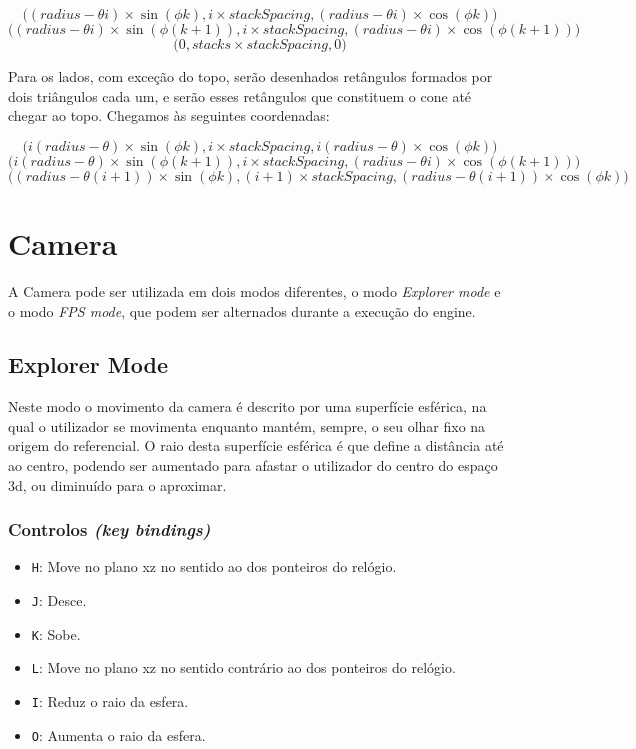 \documentclass[a4paper]{article}
\newcommand{\x}{\times}
\begin{document}
\[\Big((radius - \theta i) \x \sin(\phi k), i \x stackSpacing, (radius - \theta i) \x \cos(\phi k)\Big)\]
\[\Big((radius - \theta i) \x \sin(\phi (k + 1)), i \x stackSpacing, (radius - \theta i) \x \cos(\phi (k + 1))\Big)\]
\[\Big(0, stacks \x stackSpacing, 0\Big)\]

Para os lados, com exceção do topo, serão desenhados retângulos formados por dois triângulos cada um, e serão esses retângulos que constituem o cone até chegar ao topo. Chegamos às seguintes coordenadas:

\[\Big(i(radius - \theta) \x \sin(\phi k), i \x stackSpacing, i(radius - \theta) \x \cos(\phi k)\Big)\]
\[\Big(i(radius - \theta) \x \sin(\phi (k + 1)), i \x stackSpacing, (radius - \theta i) \x \cos(\phi (k + 1))\Big)\]
\[\Big((radius - \theta (i + 1)) \x \sin(\phi k), (i + 1) \x stackSpacing, (radius - \theta (i + 1)) \x \cos(\phi k)\Big)\]

\section{Camera}
A Camera pode ser utilizada em dois modos diferentes, o modo \textit{Explorer mode} e o modo \textit{FPS mode}, que podem ser alternados durante a execução do engine.

\subsection{Explorer Mode}

Neste modo o movimento da camera é descrito por uma superfície esférica, na qual o utilizador se movimenta enquanto mantém, sempre, o seu olhar fixo na origem do referencial. O raio desta superfície esférica é que define a distância até ao centro, podendo ser aumentado para afastar o utilizador do centro do espaço 3d, ou diminuído para o aproximar.

\subsubsection{Controlos \textit{(key bindings)}}

\begin{itemize}
    \item \texttt{H}: Move no plano xz no sentido ao dos ponteiros do relógio.
    \item \texttt{J}: Desce.
    \item \texttt{K}: Sobe.
    \item \texttt{L}: Move no plano xz no sentido contrário ao dos ponteiros do relógio.
    \item \texttt{I}: Reduz o raio da esfera.
    \item \texttt{O}: Aumenta o raio da esfera.
\end{itemize}
\end{document}
